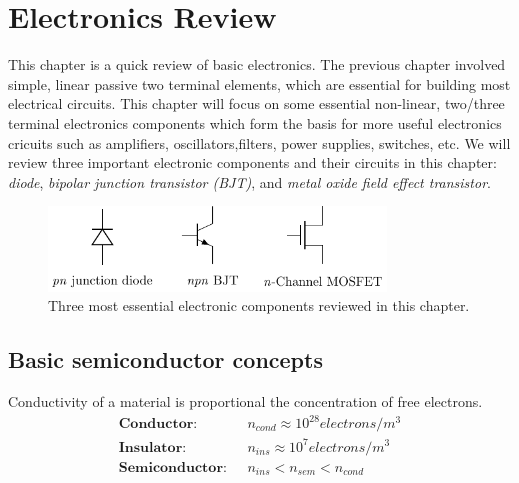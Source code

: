 \chapter{Electronics Review}\label{chp:electronics}

This chapter is a quick review of basic electronics. The previous chapter involved simple, linear passive two terminal elements, which are essential for building most electrical circuits. This chapter will focus on some essential non-linear, two/three terminal electronics components which form the basis for more useful electronics cricuits such as amplifiers, oscillators,filters, power supplies, switches, etc. We will review three important electronic components and their circuits in this chapter: \textit{diode}, \textit{bipolar junction transistor (BJT)}, and \textit{metal oxide field effect transistor}.

\begin{figure}[b]
    \centering
    \includegraphics[width=0.8\textwidth]{figure/ch03/fig03-01.pdf}
    \caption{Three most essential electronic components reviewed in this chapter.}
    \label{fig:03-01}
\end{figure}

\section{Basic semiconductor concepts}
Conductivity of a material is proportional the concentration of free electrons.
\begin{equation}
    \begin{split}
    \textbf{Conductor: }\,\, & n_{cond} \approx 10^{28} electrons/m^3 \\
    \textbf{Insulator: }\,\, & n_{ins} \approx 10^{7} electrons/m^3 \\
    \textbf{Semiconductor: }\,\, & n_{ins} < n_{sem} < n_{cond}
    \end{split}
    \label{eq:ch03-elec-conc}
\end{equation}

